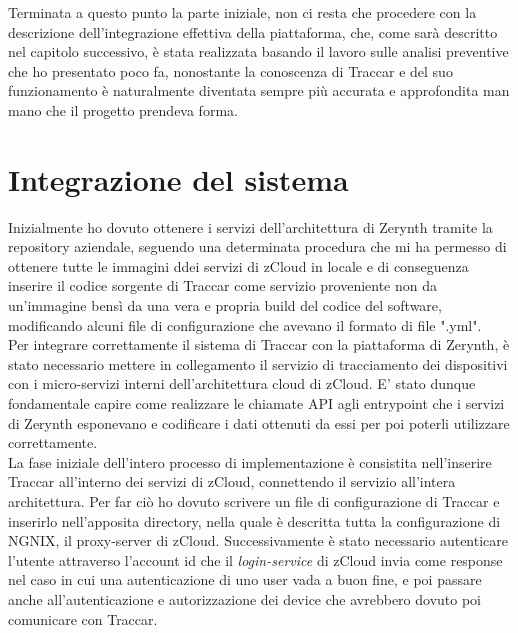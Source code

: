 \documentclass[a4paper,titlepage,12pt]{report}
\begin{document}
{Terminata a questo punto la parte iniziale, non ci resta che procedere con la descrizione dell'integrazione effettiva della piattaforma, che, come sarà descritto nel capitolo successivo, è stata realizzata basando il lavoro sulle analisi preventive che ho presentato poco fa, nonostante la conoscenza di Traccar e del suo funzionamento è naturalmente diventata sempre più accurata e approfondita man mano che il progetto prendeva forma.


\chapter{
Integrazione del sistema}
Inizialmente ho dovuto ottenere i servizi dell'architettura di Zerynth tramite la repository aziendale, seguendo una determinata procedura che mi ha permesso di ottenere tutte le immagini ddei servizi di zCloud in locale e di conseguenza inserire il codice sorgente di Traccar come servizio proveniente non da un'immagine bensì da una vera e propria build del codice del software, modificando alcuni file di configurazione che avevano il formato di file ".yml".\\
Per integrare correttamente il sistema di Traccar con la piattaforma di Zerynth, è stato necessario mettere in collegamento il servizio di tracciamento dei dispositivi con i micro-servizi interni dell'architettura cloud di zCloud. E' stato dunque fondamentale capire come realizzare le chiamate API agli entrypoint che i servizi di Zerynth esponevano e codificare i dati ottenuti da essi per poi poterli utilizzare correttamente. \\
La fase iniziale dell'intero processo di implementazione è consistita nell'inserire Traccar all'interno dei servizi di zCloud, connettendo il servizio all'intera architettura. Per far ciò ho dovuto scrivere un file di configurazione di Traccar e inserirlo nell'apposita directory, nella quale è descritta tutta la configurazione di NGNIX, il proxy-server di zCloud. Successivamente è stato necessario autenticare l'utente attraverso l'account id che il \textit{login-service} di zCloud invia come response nel caso in cui una autenticazione di uno user vada a buon fine, e poi passare anche all'autenticazione e autorizzazione dei device che avrebbero dovuto poi comunicare con Traccar. \\
}
\end{document}
